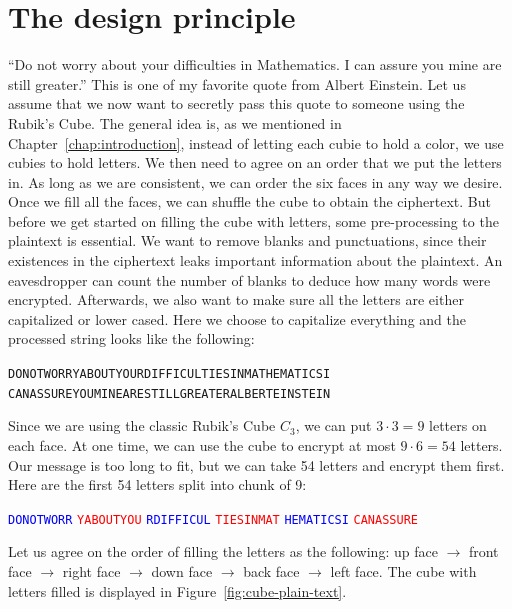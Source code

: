 \section{The design principle}
\par ``Do not worry about your difficulties in Mathematics. I can assure you mine are still greater.'' This is one of my favorite quote from Albert Einstein. Let us assume that we now want to secretly pass this quote to someone using the Rubik's Cube. The general idea is, as we mentioned in Chapter~\ref{chap:introduction}, instead of letting each cubie to hold a color, we use cubies to hold letters. We then need to agree on an order that we put the letters in. As long as we are consistent, we can order the six faces in any way we desire. Once we fill all the faces, we can shuffle the cube to obtain the ciphertext. But before we get started on filling the cube with letters, some pre-processing to the plaintext is essential. We want to remove blanks and punctuations, since their existences in the ciphertext leaks important information about the plaintext. An eavesdropper can count the number of blanks to deduce how many words were encrypted. Afterwards, we also want to make sure all the letters are either capitalized or lower cased. Here we choose to capitalize everything and the processed string looks like the following:
\begin{center}
    \texttt{DONOTWORRYABOUTYOURDIFFICULTIESINMATHEMATICSI} \\
    \texttt{CANASSUREYOUMINEARESTILLGREATERALBERTEINSTEIN}
\end{center}
Since we are using the classic Rubik's Cube $C_3$, we can put $3 \cdot 3 = 9$ letters on each face. At one time, we can use the cube to encrypt at most $9 \cdot 6 = 54$ letters. Our message is too long to fit, but we can take 54 letters and encrypt them first. Here are the first 54 letters split into chunk of 9:
\begin{center}
    \textcolor{blue}{\texttt{DONOTWORR}} \; \textcolor{red}{\texttt{YABOUTYOU}} \; \textcolor{blue}{\texttt{RDIFFICUL}} \;
    \textcolor{red}{\texttt{TIESINMAT}} \; \textcolor{blue}{\texttt{HEMATICSI}} \; \textcolor{red}{\texttt{CANASSURE}}
\end{center}
\par Let us agree on the order of filling the letters as the following: up face $\rightarrow$ front face $\rightarrow$ right face $\rightarrow$ down face $\rightarrow$ back face $\rightarrow$ left face. The cube with letters filled is displayed in Figure~\ref{fig:cube-plain-text}.
